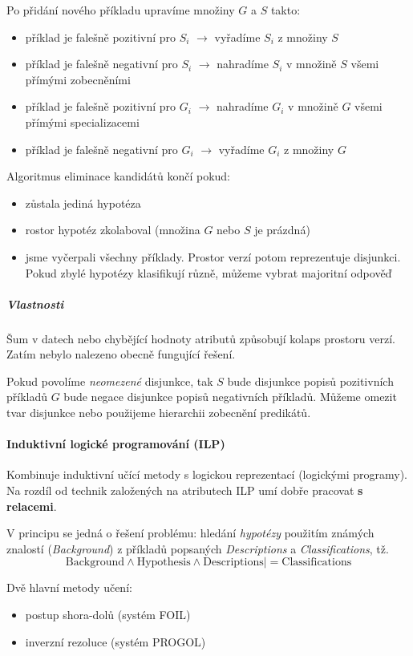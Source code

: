 \documentclass[11pt]{report} %
\numberwithin{equation}{section}
\begin{document}
Po přidání nového příkladu upravíme množiny $G$ a $S$ takto:
\begin{itemize}
\item příklad je falešně pozitivní pro $S_i$ $\to$ vyřadíme $S_i$ z množiny $S$
\item příklad je falešně negativní pro $S_i$ $\to$ nahradíme $S_i$ v množině $S$ všemi přímými zobecněními
\item příklad je falešně pozitivní pro $G_i$ $\to$ nahradíme $G_i$ v množině $G$ všemi přímými specializacemi
\item příklad je falešně negativní pro $G_i$ $\to$ vyřadíme $G_i$ z množiny $G$
\end{itemize}

Algoritmus eliminace kandidátů končí pokud:
\begin{itemize}
\item zůstala jediná hypotéza
\item rostor hypotéz zkolaboval (množina $G$ nebo $S$ je prázdná)
\item jsme vyčerpali všechny příklady. Prostor verzí potom reprezentuje disjunkci. Pokud zbylé hypotézy klasifikují různě, můžeme vybrat majoritní odpověď
\end{itemize}

\subparagraph{Vlastnosti}
Šum v datech nebo chybějící hodnoty atributů způsobují kolaps prostoru verzí. Zatím nebylo nalezeno obecně fungující řešení. 

Pokud povolíme \textit{neomezené} disjunkce, tak $S$ bude disjunkce popisů pozitivních příkladů $G$ bude negace disjunkce popisů negativních příkladů. Můžeme omezit tvar disjunkce nebo použijeme hierarchii zobecnění predikátů.

\paragraph{Induktivní logické programování (ILP)}
Kombinuje induktivní učící metody s logickou reprezentací (logickými programy). Na rozdíl od technik založených na atributech ILP umí dobře pracovat \textbf{s relacemi}.

V principu se jedná o řešení problému: hledání \textit{hypotézy} použitím známých znalostí (\textit{Background}) z příkladů popsaných \textit{Descriptions} a \textit{Classifications}, tž.
$$\text{Background} \wedge \text{Hypothesis} \wedge \text{Descriptions} |= \text{Classifications}$$

Dvě hlavní metody učení:
\begin{itemize}
\item postup shora-dolů (systém FOIL)
\item inverzní rezoluce (systém PROGOL)	
\end{itemize}
\end{document}
